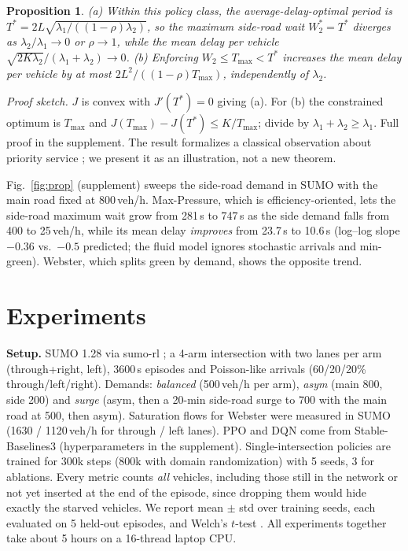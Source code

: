 \documentclass{article}
\newtheorem{proposition}{Proposition}
\begin{document}
\begin{proposition}\label{prop:starve}
(a) Within this policy class, the average-delay-optimal period is
$T^*=2L\sqrt{\lambda_1/((1-\rho)\lambda_2)}$, so the maximum side-road wait $W_2^*=T^*$
diverges as $\lambda_2/\lambda_1\to0$ or $\rho\to1$, while the mean delay per vehicle
$\sqrt{2K\lambda_2}/(\lambda_1+\lambda_2)\to0$.
(b) Enforcing $W_2\le T_{\max}<T^*$ increases the mean delay per vehicle by at most
$2L^2/((1-\rho)T_{\max})$, independently of $\lambda_2$.
\end{proposition}
\emph{Proof sketch.} $J$ is convex with $J'(T^*)=0$ giving (a). For (b) the constrained
optimum is $T_{\max}$ and $J(T_{\max})-J(T^*)\le K/T_{\max}$; divide by $\lambda_1+\lambda_2\ge\lambda_1$.
Full proof in the supplement. The result formalizes a classical observation about priority
service \cite{Kleinrock76}; we present it as an illustration, not a new theorem.

Fig.~\ref{fig:prop} (supplement) sweeps the side-road demand in SUMO with the main road fixed
at 800\,veh/h. Max-Pressure, which is efficiency-oriented, lets the side-road maximum wait grow
from 281\,s to 747\,s as the side demand falls from 400 to 25\,veh/h, while its mean delay
\emph{improves} from 23.7\,s to 10.6\,s (log--log slope $-0.36$ vs.\ $-0.5$ predicted; the
fluid model ignores stochastic arrivals and min-green). Webster, which splits green by
demand, shows the opposite trend.

\section{Experiments}\label{sec:exp}
\textbf{Setup.} SUMO 1.28 \cite{LopezBBEFHLRWW18} via sumo-rl \cite{sumorl}; a 4-arm
intersection with two lanes per arm (through+right, left), 3600\,s episodes and Poisson-like
arrivals (60/20/20\% through/left/right). Demands: \emph{balanced} (500\,veh/h per arm),
\emph{asym} (main 800, side 200) and \emph{surge} (asym, then a 20-min side-road surge to
700 with the main road at 500, then asym). Saturation flows for Webster were measured in
SUMO (1630 / 1120\,veh/h for through / left lanes). PPO and DQN come from Stable-Baselines3
\cite{RaffinHGKED21} (hyperparameters in the supplement). Single-intersection policies are
trained for 300k steps (800k with domain randomization) with 5 seeds, 3 for ablations.
Every metric counts \emph{all} vehicles, including those still in the network or not yet
inserted at the end of the episode, since dropping them would hide exactly the starved
vehicles. We report mean $\pm$ std over training seeds, each evaluated on 5 held-out
episodes, and Welch's $t$-test \cite{HendersonIBPPM18}. All experiments together take about
5 hours on a 16-thread laptop CPU.
\end{document}
